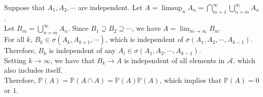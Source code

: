 \documentclass{huhtakm-template-book-v2}
\newcommand{\prob}{\mathbb{P}}
\begin{document}
    \begin{proofing}
        Suppose that $A_{1},A_{2},\cdots$ are independent. Let $A = \limsup_{n}A_{n} = \bigcap_{m = 1}^{\infty}\bigcup_{n = m}^{\infty}A_{n}$.\\
        Let $B_{m} = \bigcup_{n = m}^{\infty}A_{n}$.  Since $B_{1}\supseteq B_{2}\supseteq\cdots$, we have $A = \lim_{m \to \infty}B_{m}$.\\
        For all $k$, $B_{k} \in \sigma(A_{k},A_{k+1},\cdots)$, which is independent of $\sigma(A_{1},A_{2},\cdots,A_{k-1})$.\\
        Therefore, $B_{k}$ is independent of any $A_{i} \in \sigma(A_{1},A_{2},\cdots,A_{k-1})$.\\
        Setting $k \to \infty$, we have that $B_{k} \to A$ is independent of all elements in $\mathcal{A}$, which also includes itself.\\
        Therefore, $\prob(A) = \prob(A\cap A) = \prob(A)\prob(A)$, which implies that $\prob(A) = 0$ or $1$.
    \end{proofing}
    \newpage
\end{document}
